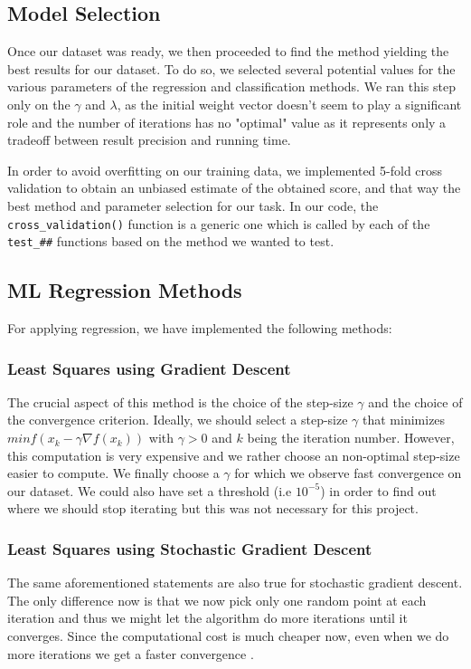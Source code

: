 \documentclass[10pt,conference,compsocconf]{IEEEtran}
\begin{document}
\subsection{Model Selection}
Once our dataset was ready, we then proceeded to find the method yielding the best results for our dataset. To do so, we selected several potential values for the various parameters of the regression and classification methods. We ran this step only on the $\gamma$ and $\lambda$, as the initial weight vector doesn't seem to play a significant role and the number of iterations has no "optimal" value as it represents only a tradeoff between result precision and running time.
\par In order to avoid overfitting on our training data, we implemented 5-fold cross validation to obtain an unbiased estimate of the obtained score, and that way the best method and parameter selection for our task. In our code, the \verb|cross_validation()| function is a generic one which is called by each of the \verb|test_##| functions based on the method we wanted to test.

\subsection{ML Regression Methods}
For applying regression, we have implemented the following methods:
\subsubsection{Least Squares using Gradient Descent}
The crucial aspect of this method is the choice of the step-size $\gamma$ and the choice of the convergence criterion. Ideally, we should select a step-size $\gamma$ that minimizes $min f(x_k - \gamma \nabla f(x_k))$ with $\gamma>0$ and $k$ being the iteration number. However, this computation is very expensive and we rather choose an non-optimal step-size easier to compute. We finally choose a $\gamma$ for which we observe fast convergence on our dataset. We could also have set a threshold (i.e $10^{-5}$) in order to find out where we should stop iterating but this was not necessary for this project.

\subsubsection{Least Squares using Stochastic Gradient Descent}
The same aforementioned statements are also true for stochastic gradient descent. The only difference now is that we now pick only one random point at each iteration and thus we might let the algorithm do more iterations until it converges. Since the computational cost is much cheaper now, even when we do more iterations we get a faster convergence .
\end{document}
